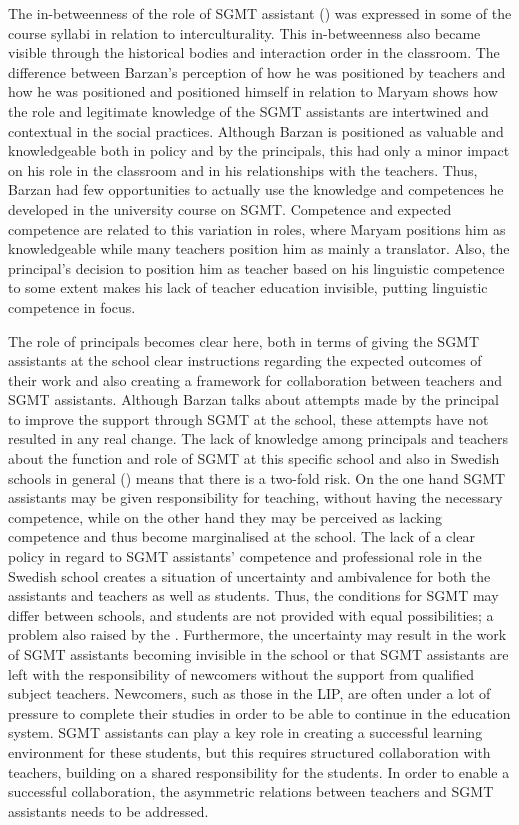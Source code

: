 \documentclass[output=paper]{langscibook}
\begin{document}
The in-betweenness of the role of SGMT assistant (\citealt{St_john2021})  was expressed in some of the course syllabi in relation to interculturality. This in-betweenness also became visible through the historical bodies and interaction order in the classroom. The difference between Barzan’s perception of how he was positioned by teachers and how he was positioned and positioned himself in relation to Maryam shows how the role and legitimate knowledge of the SGMT assistants are intertwined and contextual in the social practices. Although Barzan is positioned as valuable and knowledgeable both in policy and by the principals, this had only a minor impact on his role in the classroom and in his relationships with the teachers. Thus, Barzan had few opportunities to actually use the knowledge and competences he developed in the university course on SGMT. Competence and expected competence are related to this variation in roles, where Maryam positions him as knowledgeable while many teachers position him as mainly a translator. Also, the principal’s decision to position him as teacher based on his linguistic competence to some extent makes his lack of teacher education invisible, putting linguistic competence in focus.

The role of principals becomes clear here, both in terms of giving the SGMT assistants at the school clear instructions regarding the expected outcomes of their work and also creating a framework for collaboration between teachers and SGMT assistants. Although Barzan talks about attempts made by the principal to improve the support through SGMT at the school, these attempts have not resulted in any real change. The lack of knowledge among principals and teachers about the function and role of SGMT at this specific school and also in Swedish schools in general (\citealt{WedinRosen2022}) means that there is a two-fold risk. On the one hand SGMT assistants may be given responsibility for teaching, without having the necessary competence, while on the other hand they may be perceived as lacking competence and thus become marginalised at the school. The lack of a clear policy in regard to SGMT assistants’ competence and professional role in the Swedish school creates a situation of uncertainty and ambivalence for both the assistants and teachers as well as students. Thus, the conditions for SGMT may differ between schools, and students are not provided with equal possibilities; a problem also raised by the \citet{Swedish_school_inspectorate2017}.  Furthermore, the uncertainty may result in the work of SGMT assistants becoming invisible in the school or that SGMT assistants are left with the responsibility of newcomers without the support from qualified subject teachers. Newcomers, such as those in the LIP, are often under a lot of pressure to complete their studies in order to be able to continue in the education system. SGMT assistants can play a key role in creating a successful learning environment for these students, but this requires structured collaboration with teachers, building on a shared responsibility for the students. In order to enable a successful collaboration, the asymmetric relations between teachers and SGMT assistants needs to be addressed.
\end{document}
